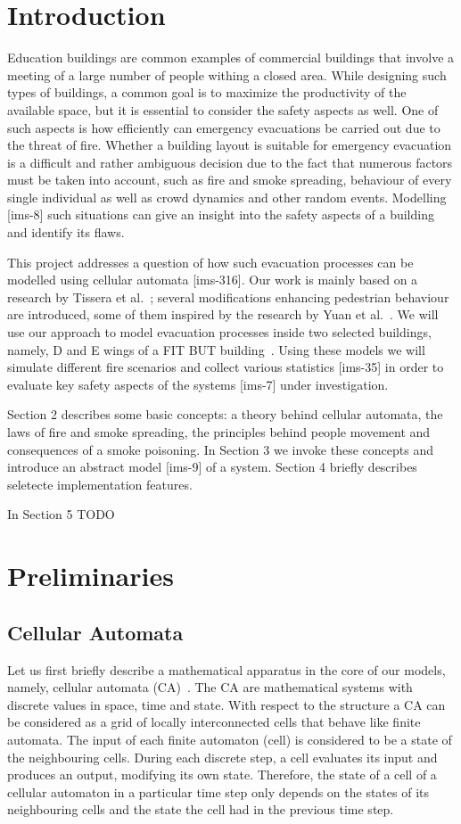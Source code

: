 \section{Introduction}
Education buildings are common examples of commercial buildings that involve a
meeting of a large number of people withing a closed area.
While designing such types of buildings, a common goal is to maximize the
productivity of the available space, but it is essential to consider the
safety aspects as well.
One of such aspects is how efficiently can emergency evacuations be carried out
due to the threat of fire.
Whether a building layout is suitable for emergency evacuation is a difficult
and rather ambiguous decision due to the fact that numerous factors must be
taken into account, such as fire and smoke spreading, behaviour of every single
individual as well as crowd dynamics and other random events.
Modelling [ims-8] such situations can give an insight into the safety aspects
of a building and identify its flaws.

This project addresses a question of how such evacuation processes can be
modelled using cellular automata [ims-316].
Our work is mainly based on a research by Tissera et al.~\cite{Tissera1};
several modifications enhancing pedestrian behaviour are introduced, some of
them inspired by the research by Yuan et al.~\cite{Yuan}.
We will use our approach to model evacuation processes inside two selected
buildings, namely, D and E wings of a FIT BUT building~\cite{FIT}.
Using these models we will simulate different fire scenarios and collect
various statistics [ims-35] in order to evaluate key safety aspects of the
systems [ims-7] under investigation.

Section 2 describes some basic concepts: a theory behind cellular automata,
the laws of fire and smoke spreading, the principles behind people movement and
consequences of a smoke poisoning.
In Section 3 we invoke these concepts and introduce an abstract model [ims-9]
of a system.
Section 4 briefly describes seletecte implementation features.

{In Section 5 TODO}

\section{Preliminaries}
\subsection{Cellular Automata}
Let us first briefly describe a mathematical apparatus in the core of our
models, namely, cellular automata (CA)~\cite{Wolfram}.
The CA are mathematical systems with discrete values in space, time and
state.
With respect to the structure a CA can be considered as a grid of locally
interconnected cells that behave like finite automata.
The input of each finite automaton (cell) is considered to be a state of the
neighbouring cells.
During each discrete step, a cell evaluates its input and produces an
output, modifying its own state.
Therefore, the state of a cell of a cellular automaton in a particular time
step only depends on the states of its neighbouring cells and the state the
cell had in the previous time step.

